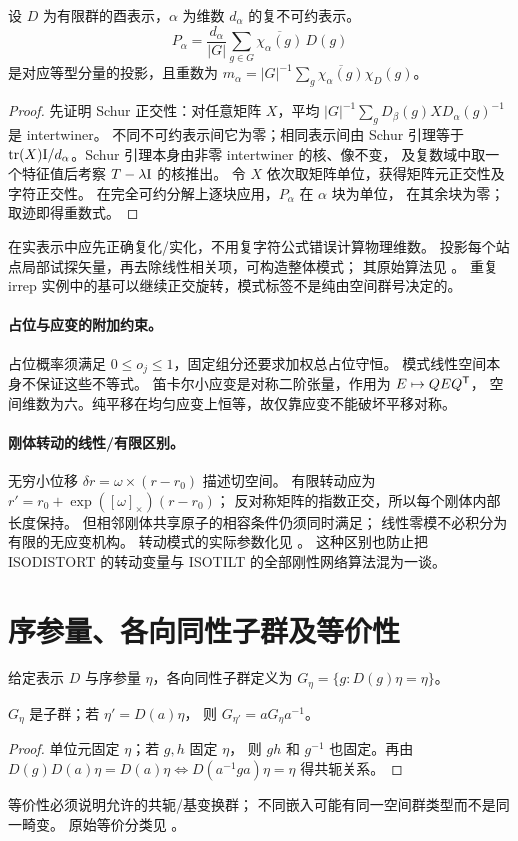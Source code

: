\begin{theorem}[不可约分量投影]\label{thm:irproj}
设 $D$ 为有限群的酉表示，$\alpha$ 为维数 $d_\alpha$ 的复不可约表示。
\[
 P_\alpha=\frac{d_\alpha}{|G|}
 \sum_{g\in G}\overline{\chi_\alpha(g)}\,D(g)
\]
是对应等型分量的投影，且重数为
$m_\alpha=|G|^{-1}\sum_g\overline{\chi_\alpha(g)}\chi_D(g)$。
\end{theorem}
\begin{proof}
先证明 Schur 正交性：对任意矩阵 $X$，平均
$|G|^{-1}\sum_g D_\beta(g)X D_\alpha(g)^{-1}$ 是 intertwiner。
不同不可约表示间它为零；相同表示间由 Schur 引理等于
$\operatorname{tr}(X)\mathrm I/d_\alpha$。Schur 引理本身由非零 intertwiner 的核、像不变，
及复数域中取一个特征值后考察 $T-\lambda\mathrm I$ 的核推出。
令 $X$ 依次取矩阵单位，获得矩阵元正交性及字符正交性。
在完全可约分解上逐块应用，$P_\alpha$ 在 $\alpha$ 块为单位，
在其余块为零；取迹即得重数式。
\end{proof}
在实表示中应先正确复化/实化，不用复字符公式错误计算物理维数。
投影每个站点局部试探矢量，再去除线性相关项，可构造整体模式；
其原始算法见 \citet{Stokes1991}。
重复 irrep 实例中的基可以继续正交旋转，模式标签不是纯由空间群号决定的。

\paragraph{占位与应变的附加约束。}
占位概率须满足 $0\leq o_j\leq1$，固定组分还要求加权总占位守恒。
模式线性空间本身不保证这些不等式。
笛卡尔小应变是对称二阶张量，作用为 $E\mapsto QEQ^\mathsf T$，
空间维数为六。纯平移在均匀应变上恒等，故仅靠应变不能破坏平移对称。

\paragraph{刚体转动的线性/有限区别。}
无穷小位移 $\delta r=\omega\times(r-r_0)$ 描述切空间。
有限转动应为 $r'=r_0+\exp([\omega]_\times)(r-r_0)$；
反对称矩阵的指数正交，所以每个刚体内部长度保持。
但相邻刚体共享原子的相容条件仍须同时满足；
线性零模不必积分为有限的无应变机构。
转动模式的实际参数化见 \citet{Muller2014,Howard1998,HowardErratum2002}。
这种区别也防止把 ISODISTORT 的转动变量与 ISOTILT 的全部刚性网络算法混为一谈。

\section{序参量、各向同性子群及等价性}\label{sec:isotropy}
给定表示 $D$ 与序参量 $\eta$，各向同性子群定义为
$G_\eta=\{g:D(g)\eta=\eta\}$。
\begin{proposition}
$G_\eta$ 是子群；若 $\eta'=D(a)\eta$，
则 $G_{\eta'}=aG_\eta a^{-1}$。
\end{proposition}
\begin{proof}
单位元固定 $\eta$；若 $g,h$ 固定 $\eta$，
则 $gh$ 和 $g^{-1}$ 也固定。再由
$D(g)D(a)\eta=D(a)\eta\iff D(a^{-1}ga)\eta=\eta$ 得共轭关系。
\end{proof}
等价性必须说明允许的共轭/基变换群；
不同嵌入可能有同一空间群类型而不是同一畸变。
原始等价分类见 \citet{Stokes1985}。

